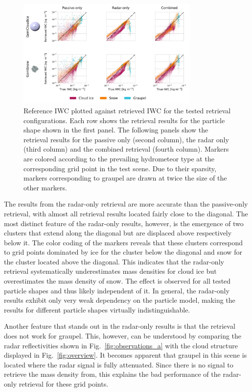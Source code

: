 \documentclass[journal abbreviation, manuscript]{copernicus}
\begin{document}
\begin{figure}
\centering \includegraphics[width = 0.8\textwidth]{../plots/results_scatter_a_1}
\caption{Reference IWC plotted against retrieved IWC for the tested retrieval
  configurations. Each row shows the retrieval results for the particle shape
  shown in the first panel. The following panels show the retrieval results for
  the passive only (second column), the radar only (third column) and the
  combined retrieval (fourth column). Markers are colored according to the
  prevailing hydrometeor type at the corresponding grid point in the test
  scene. Due to their sparsity, markers corresponding to graupel are drawn at
  twice the size of the other markers.}
\label{fig:results_scatter_a_1}
\end{figure}

The results from the radar-only retrieval are more accurate than the
passive-only retrieval, with almost all retrieval results located fairly close
to the diagonal. The most distinct feature of the radar-only results, however,
is the emergence of two clusters that extend along the diagonal but are
displaced above respectively below it. The color coding of the markers reveals
that these clusters correspond to grid points dominated by ice for the cluster
below the diagonal and snow for the cluster located above the diagonal. This
indicates that the radar-only retrieval systematically underestimates mass
densities for cloud ice but overestimates the mass density of snow. The effect
is observed for all tested particle shapes and thus likely independent of it. In
general, the radar-only results exhibit only very weak dependency on the
particle model, making the results for different particle shapes virtually
indistinguishable.

Another feature that stands out in the radar-only results is that the retrieval
does not work for graupel. This, however, can be understood by comparing the
radar reflectivities shown in Fig.~\ref{fig:observations_a} with the cloud
structure displayed in Fig.~\ref{fig:overview}. It becomes apparent that graupel
in this scene is located where the radar signal is fully attenuated. Since there
is no signal to retrieve the mass density from, this explains the bad
performance of the radar-only retrieval for these grid points.
\end{document}
